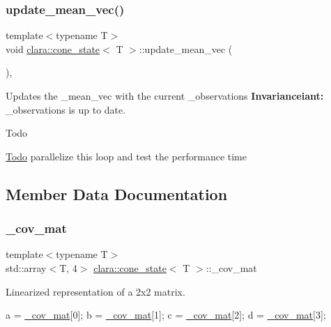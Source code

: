\subsubsection{\texorpdfstring{update\+\_\+mean\+\_\+vec()}{update\_mean\_vec()}}
{\footnotesize\ttfamily template$<$typename T$>$ \\
void \hyperlink{classclara_1_1cone__state}{clara\+::cone\+\_\+state}$<$ T $>$\+::update\+\_\+mean\+\_\+vec (\begin{DoxyParamCaption}{ }\end{DoxyParamCaption})\hspace{0.3cm}{\ttfamily [inline]}, {\ttfamily [private]}}



Updates the {\ttfamily \+\_\+mean\+\_\+vec} with the current {\ttfamily \+\_\+observations} {\bfseries Invarianceiant\+:} {\ttfamily \+\_\+observations} is up to date. 

\begin{DoxyRefDesc}{Todo}
\item[\hyperlink{todo__todo000007}{Todo}]parallelize this loop and test the performance time \end{DoxyRefDesc}


\subsection{Member Data Documentation}
\mbox{\label{classclara_1_1cone__state_a2a5e7dc2078a6d5ef80b1bac25354e2f}} 
\subsubsection{\texorpdfstring{\+\_\+cov\+\_\+mat}{\_cov\_mat}}
{\footnotesize\ttfamily template$<$typename T$>$ \\
std\+::array$<$T, 4$>$ \hyperlink{classclara_1_1cone__state}{clara\+::cone\+\_\+state}$<$ T $>$\+::\+\_\+cov\+\_\+mat}



Linearized representation of a 2x2 matrix. 


\begin{DoxyCode}
a = \hyperlink{classclara_1_1cone__state_a2a5e7dc2078a6d5ef80b1bac25354e2f}{\_cov\_mat}[0];
b = \hyperlink{classclara_1_1cone__state_a2a5e7dc2078a6d5ef80b1bac25354e2f}{\_cov\_mat}[1];
c = \hyperlink{classclara_1_1cone__state_a2a5e7dc2078a6d5ef80b1bac25354e2f}{\_cov\_mat}[2];
d = \hyperlink{classclara_1_1cone__state_a2a5e7dc2078a6d5ef80b1bac25354e2f}{\_cov\_mat}[3];
\end{DoxyCode}



